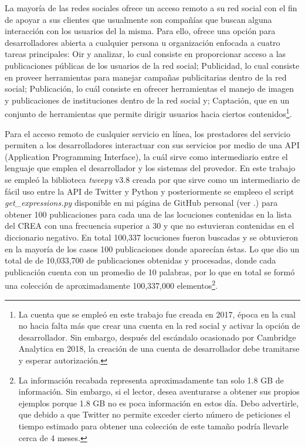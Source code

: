 La mayoría de las redes sociales ofrece un acceso remoto a su red social con el fin de apoyar a sus clientes que usualmente son compañías que buscan alguna interacción con los usuarios del la misma. Para ello, \cite{twitterdev} ofrece una opción para desarrolladores abierta a cualquier persona u organización enfocada a cuatro tareas principales: Oir y analizar, lo cual consiste en proporcionar acceso a las publicaciones públicas de los usuarios de la red social; Publicidad, lo cual consiste en proveer herramientas para manejar campañas publicitarias dentro de la red social; Publicación, lo cuál consiste en ofrecer herramientas el manejo de imagen y publicaciones de instituciones dentro de la red social y; Captación, que en un conjunto de herramientas que permite dirigir usuarios hacia ciertos contenidos\footnote{La cuenta que se empleó en este trabajo fue creada en 2017, época en la cual no hacia falta más que crear una cuenta en la red social y activar la opción de desarrollador. Sin embargo, después del escándalo ocasionado por Cambridge Analytica en 2018, la creación de una cuenta de desarrollador debe tramitarse y esperar autorización.}.

Para el acceso remoto de cualquier servicio en línea, los prestadores del servicio permiten a los desarrolladores interactuar con sus servicios por medio de una API (Application Programming Interface), la cuál sirve como intermediario entre el lenguaje que emplea el desarrollador y los sistemas del provedor. En este trabajo se empleó la biblioteca \textit{tweepy} v3.8 creada por \cite{tweepy} que sirve como un intermediario de fácil uso entre la API de Twitter y Python y posteriormente se empleeo el script \textit{get\_expressions.py} disponible en mi página de GitHub personal (ver .)  para obtener 100 publicaciones para cada una de las locuciones contenidas en la lista del CREA con una frecuencia superior a 30 y que no estuvieran contenidas en el diccionario negativo. En total 100,337 locuciones fueron buscadas y se obtuvieron en la mayoría de los casos 100 publicaciones donde aparecían éstas. Lo que dio un total de de 10,033,700 de publicaciones obtenidas y procesadas, donde cada publicación cuenta con un promedio de 10 palabras, por lo que en total se formó una colección de aproximadamente 100,337,000 elementos\footnote{La información recabada representa aproximadamente tan solo 1.8 GB de información. Sin embargo, si el lector, desea aventurarse a obtener sus propios ejemplos porque 1.8 GB no es poca información en estos día. Debo advertirle, que debido a que Twitter no permite exceder cierto número de peticiones el tiempo estimado para obtener una colección de este tamaño podría llevarle cerca de 4 meses.}. 

